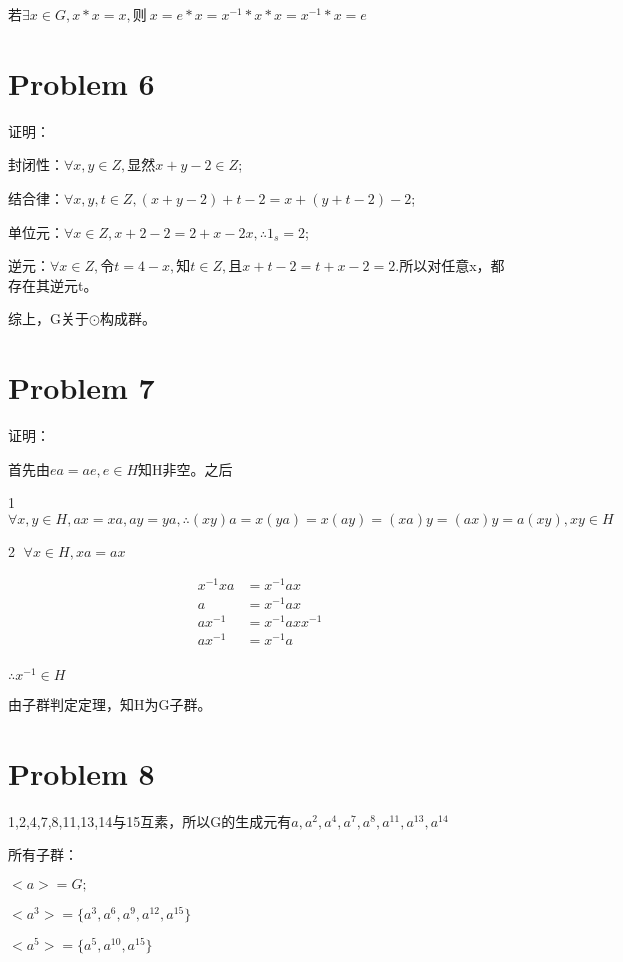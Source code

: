 \documentclass{article}
\begin{document}
若$\exists x\in G,x*x=x,$则$\ x=e*x=x^{-1}*x*x= x^{-1}*x = e$

\section*{Problem 6}
证明：

封闭性：$\forall x,y\in Z,$显然$x+y-2\in Z$;

结合律：$\forall x,y,t\in Z,(x+y-2)+t-2=x+(y+t-2)-2$;

单位元：$\forall x\in Z,x+2-2=2+x-2x,\therefore 1_s=2$;

逆元：$\forall x\in Z,$令$t=4-x,$知$t\in Z,$且$x+t-2=t+x-2=2.$所以对任意x，都存在其逆元t。

综上，G关于$\odot$构成群。

\section*{Problem 7}
证明：

首先由$ea=ae,e\in H$知H非空。之后

\textcircled{1}
$\forall x,y\in H,ax=xa,ay=ya,\therefore (xy)a=x(ya)=x(ay)=(xa)y=(ax)y=a(xy),xy\in H$

\textcircled{2}
$\forall x\in H,xa=ax$


\begin{equation}
    \nonumber
    \begin{split}
        x^{-1}xa&=x^{-1}ax\\
        a&=x^{-1}ax\\
        ax^{-1}&=x^{-1}axx^{-1}\\
        ax^{-1}&=x^{-1}a\\
    \end{split}
\end{equation}

$\therefore x^{-1}\in H$

由子群判定定理，知H为G子群。

\section*{Problem 8}
1,2,4,7,8,11,13,14与15互素，所以G的生成元有$a,a^{2},a^{4},a^{7},a^{8},a^{11},a^{13},a^{14}$

所有子群：

$<a>=G;$

$<a^{3}>=\{a^{3},a^{6},a^{9},a^{12},a^{15}\}$

$<a^{5}>=\{a^{5},a^{10},a^{15}\}$
\end{document}
